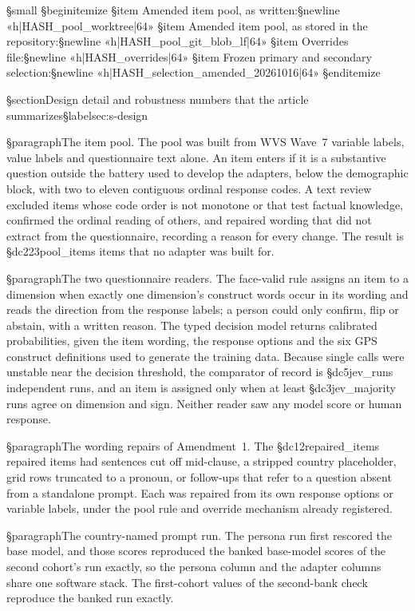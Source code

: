 {{§small
§begin{itemize}
§item Amended item pool, as written:§newline «h|HASH_pool_worktree|64»
§item Amended item pool, as stored in the repository:§newline «h|HASH_pool_git_blob_lf|64»
§item Overrides file:§newline «h|HASH_overrides|64»
§item Frozen primary and secondary selection:§newline «h|HASH_selection_amended_20261016|64»
§end{itemize}}

§section{Design detail and robustness numbers that the article summarizes}§label{sec:s-design}

§paragraph{The item pool.} The pool was built from WVS Wave~7 variable labels, value labels and questionnaire text alone. An item enters if it is a substantive question outside the battery used to develop the adapters, below the demographic block, with two to eleven contiguous ordinal response codes. A text review excluded items whose code order is not monotone or that test factual knowledge, confirmed the ordinal reading of others, and repaired wording that did not extract from the questionnaire, recording a reason for every change. The result is §dc{223}{pool_items} items that no adapter was built for.

§paragraph{The two questionnaire readers.} The face-valid rule assigns an item to a dimension when exactly one dimension's construct words occur in its wording and reads the direction from the response labels; a person could only confirm, flip or abstain, with a written reason. The typed decision model returns calibrated probabilities, given the item wording, the response options and the six GPS construct definitions used to generate the training data. Because single calls were unstable near the decision threshold, the comparator of record is §dc{5}{jev_runs} independent runs, and an item is assigned only when at least §dc{3}{jev_majority} runs agree on dimension and sign. Neither reader saw any model score or human response.

§paragraph{The wording repairs of Amendment~1.} The §dc{12}{repaired_items} repaired items had sentences cut off mid-clause, a stripped country placeholder, grid rows truncated to a pronoun, or follow-ups that refer to a question absent from a standalone prompt. Each was repaired from its own response options or variable labels, under the pool rule and override mechanism already registered.

§paragraph{The country-named prompt run.} The persona run first rescored the base model, and those scores reproduced the banked base-model scores of the second cohort's run exactly, so the persona column and the adapter columns share one software stack. The first-cohort values of the second-bank check reproduce the banked run exactly.

}
